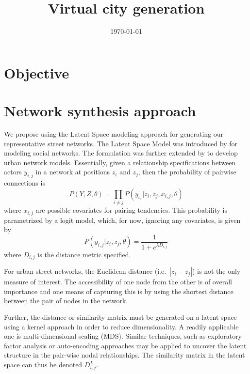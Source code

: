 \documentclass[11pt,twoside]{article}
\numberwithin{equation}{section}
\newcommand{\?}{\stackrel{?}{=}}
\begin{document}
\title{Virtual city generation}
\date{\small\today}
\maketitle

\thispagestyle{empty}

\tableofcontents
\section{Objective} 


\section{Network synthesis approach}
We propose using the Latent Space modeling approach for generating our representative street networks.
The Latent Space Model was introduced by \textcite{hoff2002latent} for modeling social networks.
The formulation was further extended by \cite{zhou2015generating} to develop urban network models.
Essentially, given a relationship specifications between actors $y_{i,j}$ in a network at positions $z_i$ and $z_j$,
then the probability of pairwise connections is
\begin{equation}
  \label{eq:1}
  P(Y, Z, \theta) = \prod_{i\ne j} P(y_{i,}|z_i, z_j, x_{i,j},\theta)
\end{equation}
where $x_{i,j}$ are possible covariates for pairing tendencies.
This probability is parametrized by a logit model, which, for now, ignoring any covariates, is given by
\begin{equation}
  \label{eq:2}
  P(y_{i,j}|z_i,z_j,\theta) = \frac{1}{1+e^{\lambda D_{i,j}}}
\end{equation}
where $D_{i,j}$ is the distance metric specified.

For urban street networks, the Euclidean distance (i.e.\ $|z_i - z_j|$) is not the only measure of interest.
The accessibility of one node from the other is of overall importance and one means of capturing this is by using the shortest distance between the pair of nodes in the network.

Further, the distance or similarity matrix must be generated on a latent space using a kernel approach in order to reduce dimensionality.
A readily applicable one is multi-dimensional scaling (MDS).
Similar techniques, such as exploratory factor analysis or auto-encoding approaches may be applied to uncover the latent structure in the pair-wise nodal relationships.
The similarity matrix in the latent space can thus be denoted $D_{i,j}^L$.
\end{document}
